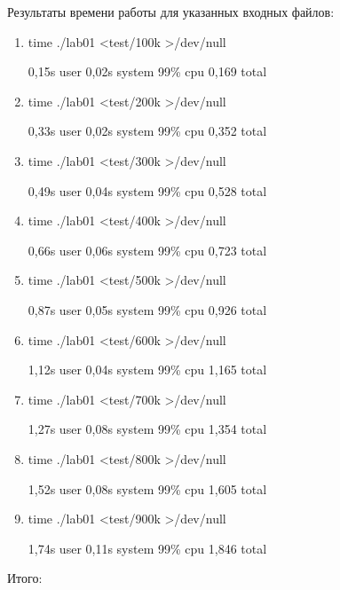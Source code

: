 \documentclass[12pt]{article}
\begin{document}
Результаты времени работы для указанных входных файлов:
\begin{enumerate}
	\item time ./lab01  <test/100k >/dev/null
	
	0,15s user 0,02s system 99\% cpu 0,169 total
	
	\item time ./lab01  <test/200k >/dev/null
	
	0,33s user 0,02s system 99\% cpu 0,352 total
	
	\item time ./lab01  <test/300k >/dev/null
	
	0,49s user 0,04s system 99\% cpu 0,528 total
	
	\item time ./lab01  <test/400k >/dev/null
	
	0,66s user 0,06s system 99\% cpu 0,723 total
	
	\item time ./lab01  <test/500k >/dev/null
	
	0,87s user 0,05s system 99\% cpu 0,926 total
	
	\item time ./lab01  <test/600k >/dev/null
	
	1,12s user 0,04s system 99\% cpu 1,165 total

	\item time ./lab01  <test/700k >/dev/null
	
	1,27s user 0,08s system 99\% cpu 1,354 total
	
	\item time ./lab01  <test/800k >/dev/null
	
	 1,52s user 0,08s system 99\% cpu 1,605 total
	
	\item time ./lab01  <test/900k >/dev/null
	
	1,74s user 0,11s system 99\% cpu 1,846 total
\end{enumerate}


Итого: 
\end{document}
